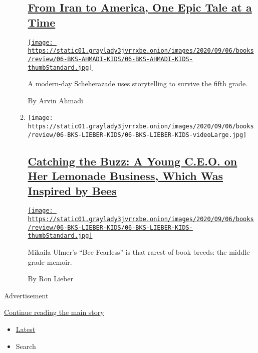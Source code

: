 \begin{enumerate}
\begin{enumerate}
    \hypertarget{from-iran-to-america-one-epic-tale-at-a-time}{%
    \subsection{\texorpdfstring{\href{/2020/08/29/books/review/daniel-nayeri-everything-sad-is-untrue.html}{From
    Iran to America, One Epic Tale at a
    Time}}{From Iran to America, One Epic Tale at a Time}}\label{from-iran-to-america-one-epic-tale-at-a-time}}

    \href{/2020/08/29/books/review/daniel-nayeri-everything-sad-is-untrue.html}{\texttt{[image: https://static01.graylady3jvrrxbe.onion/images/2020/09/06/books/review/06-BKS-AHMADI-KIDS/06-BKS-AHMADI-KIDS-thumbStandard.jpg]}}

    A modern-day Scheherazade uses storytelling to survive the fifth
    grade.

    By Arvin Ahmadi
  \item
    \texttt{[image: https://static01.graylady3jvrrxbe.onion/images/2020/09/06/books/review/06-BKS-LIEBER-KIDS/06-BKS-LIEBER-KIDS-videoLarge.jpg]}

    \hypertarget{catching-the-buzz-a-young-ceo-on-her-lemonade-business-which-was-inspired-by-bees}{%
    \subsection{\texorpdfstring{\href{/2020/08/29/books/review/mikaila-ulmer-bee-fearless.html}{Catching
    the Buzz: A Young C.E.O. on Her Lemonade Business, Which Was
    Inspired by
    Bees}}{Catching the Buzz: A Young C.E.O. on Her Lemonade Business, Which Was Inspired by Bees}}\label{catching-the-buzz-a-young-ceo-on-her-lemonade-business-which-was-inspired-by-bees}}

    \href{/2020/08/29/books/review/mikaila-ulmer-bee-fearless.html}{\texttt{[image: https://static01.graylady3jvrrxbe.onion/images/2020/09/06/books/review/06-BKS-LIEBER-KIDS/06-BKS-LIEBER-KIDS-thumbStandard.jpg]}}

    Mikaila Ulmer's ``Bee Fearless'' is that rarest of book breeds: the
    middle grade memoir.

    By Ron Lieber
  \end{enumerate}
\end{enumerate}

Advertisement

\protect\hyperlink{after-mid1}{Continue reading the main story}

\begin{itemize}
\tightlist
\item
  \protect\hyperlink{stream-panel}{Latest}
\item
  Search
\end{itemize}

